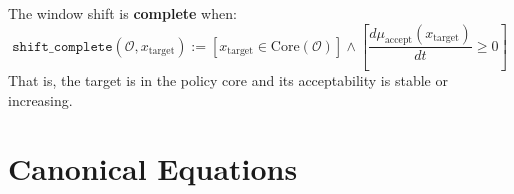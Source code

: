 \begin{definition}
\label{def:completion-criterion}
The window shift is \textbf{complete} when:
\[
\boxed{
    \mathtt{shift\_complete}(\mathcal{O}, x_{\mathrm{target}}) :=
    \left[ x_{\mathrm{target}} \in \mathrm{Core}(\mathcal{O}) \right] \land
    \left[ \frac{d\mu_{\mathrm{accept}}(x_{\mathrm{target}})}{dt} \geq 0 \right]
}
\]
That is, the target is in the policy core and its acceptability is stable or increasing.
\end{definition}

\section{Canonical Equations}
\label{sec:overton-canonical}

